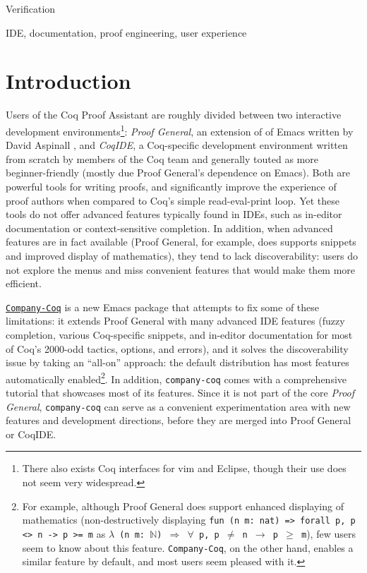 \documentclass[preprint]{sigplanconf}
\newcommand{\proofg}{Proof General\xspace}
\begin{document}
\terms Verification

\keywords IDE, documentation, proof engineering, user experience

\section*{Introduction}

Users of the Coq Proof Assistant \cite{Coq} are roughly divided between two interactive development environments\footnote{There also exists Coq interfaces for vim and Eclipse, though their use does not seem very widespread.}: \emph{\proofg}, an extension of of Emacs written by David Aspinall \cite{ProofGeneral}, and \emph{CoqIDE}, a Coq-specific development environment written from scratch by members of the Coq team and generally touted as more beginner-friendly (mostly due \proofg's dependence on Emacs). Both are powerful tools for writing proofs, and significantly improve the experience of proof authors when compared to Coq's simple read-eval-print loop. Yet these tools do not offer advanced features typically found in IDEs, such as in-editor documentation or context-sensitive completion. In addition, when advanced features are in fact available (\proofg, for example, does supports snippets and improved display of mathematics), they tend to lack discoverability: users do not explore the menus and miss convenient features that would make them more efficient.

\href{https://github.com/cpitclaudel/company-coq/}{\texttt{Company-Coq}} is a new Emacs package that attempts to fix some of these limitations: it extends \proofg with many advanced IDE features (fuzzy completion, various Coq-specific snippets, and in-editor documentation for most of Coq's 2000-odd tactics, options, and errors), and it solves the discoverability issue by taking an ``all-on'' approach: the default distribution has most features automatically enabled\footnote{For example, although \proofg does support enhanced displaying of mathematics (non-destructively displaying \texttt{fun (n m: nat) => forall p, p <> n -> p >= m} as \texttt{$\lambda$ (n m: $\mathbb{N}$) $\Rightarrow$ $\forall$ p, p $\neq$ n $\rightarrow$ p $\geq$ m}), few users seem to know about this feature. \texttt{Company-Coq}, on the other hand, enables a similar feature by default, and most users seem pleased with it.}. In addition, \texttt{company-coq} comes with a comprehensive tutorial that showcases most of its features.
Since it is not part of the core \emph{\proofg}, \texttt{company-coq} can serve as a convenient experimentation area with new features and development directions, before they are merged into \proofg or CoqIDE.
\end{document}
